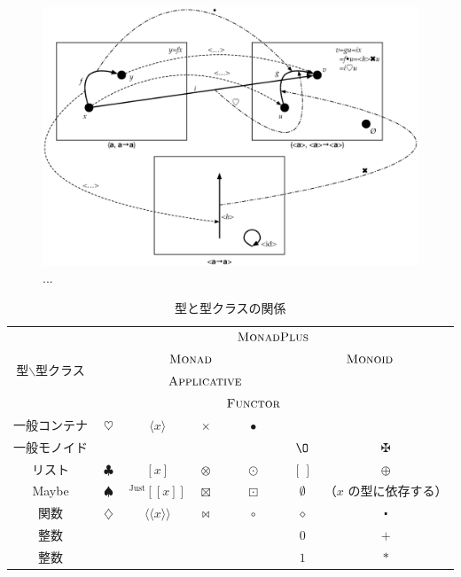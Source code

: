 \documentclass[a5paper,twoside,fleqn]{jsbook}
\def\[{\left[\!\left[}
\def\]{\right]\!\right]}
\newcommand{\Langle}{\langle\!\langle}
\newcommand{\Rangle}{\rangle\!\rangle}
\newcommand{\mEmptyList}{{[\,]}}
\newcommand{\mNothing}{\emptyset}
\newcommand{\mZero}{\O}
\newcommand{\mAnonParam}{\diamond}
\DeclareMathOperator{\mAppend}{\oplus}
\DeclareMathOperator{\mAppMap}{\times}
\DeclareMathOperator{\mAppMapFunc}{\bowtie}
\DeclareMathOperator{\mAppMapList}{\otimes}
\DeclareMathOperator{\mAppMapMaybe}{\boxtimes}
\DeclareMathOperator{\mBind}{\heartsuit}
\DeclareMathOperator{\mBindFunc}{\diamondsuit}
\DeclareMathOperator{\mBindList}{\clubsuit}
\DeclareMathOperator{\mBindMaybe}{\spadesuit}
\DeclareMathOperator{\mComp}{\centerdot}
\DeclareMathOperator{\mMap}{\bullet}
\DeclareMathOperator{\mMapFunc}{\circ}
\DeclareMathOperator{\mMapList}{\odot}
\DeclareMathOperator{\mMapMaybe}{\boxdot}
\DeclareMathOperator{\mPlus}{\maltese}
\newcommand{\mGenericValueConstructor}[1]{\mathrm{#1}}
\newcommand{\mGenericWith}[2]{{}^\mGenericValueConstructor{#1}\[#2\]}
\newcommand{\mJustWith}[1]{\mGenericWith{Just}{#1}}
\newcommand{\mFuncWith}[1]{\Langle#1\Rangle}
\newcommand{\mListWith}[1]{\left[#1\right]}
\newcommand{\mPureWith}[1]{\langle#1\rangle}
\newcommand{\mGenericTypeClass}[1]{\textsc{#1}} %
\newcommand{\mApplicativeTypeClass}{\mGenericTypeClass{Applicative}}
\newcommand{\mFunctorTypeClass}{\mGenericTypeClass{Functor}}
\newcommand{\mMonadTypeClass}{\mGenericTypeClass{Monad}}
\newcommand{\mMonadPlusTypeClass}{\mGenericTypeClass{MonadPlus}}
\newcommand{\mMonoidTypeClass}{\mGenericTypeClass{Monoid}}
\begin{document}
\begin{figure}
\begin{center}
\includegraphics[width=150mm]{fig/functor.eps}
\end{center}
\caption{...}
\label{fig:functor}
\end{figure}





\begin{table}
\label{tab:monadplus}
\caption{型と型クラスの関係}
\begin{center}
\begin{tabular}{||c||c|c|c|c|c|c||}
\hline
\multirow{4}{*}{型$\backslash$型クラス}
  &\multicolumn{6}{|c||}{$\mMonadPlusTypeClass$}\\
\cline{2-7}
\multirow{3}{*}{}
  &\multicolumn{4}{|c|}{$\mMonadTypeClass$}
  &\multicolumn{2}{|c||}{$\mMonoidTypeClass$}\\
\cline{3-5}
\multirow{2}{*}{}
  &
  &\multicolumn{3}{|c|}{$\mApplicativeTypeClass$}
  &\multicolumn{2}{|c||}{}\\
\cline{5-5}
\multirow{1}{*}{}
  &
  &\multicolumn{2}{|c|}{}
  &$\mFunctorTypeClass$
  &\multicolumn{2}{|c||}{}\\
\hline\hline
一般コンテナ
  &$\mBind$
  &$\mPureWith{x}$
  &$\mAppMap$
  &$\mMap$
  &
  &\\
\hline
一般モノイド
  &
  &
  &
  &
  &$\mZero$
  &$\mPlus$\\
\hline
リスト
  &$\mBindList$
  &$\mListWith{x}$
  &$\mAppMapList$
  &$\mMapList$
  &$\mEmptyList$
  &$\mAppend$\\
\hline
Maybe
  &$\mBindMaybe$
  &$\mJustWith{x}$
  &$\mAppMapMaybe$
  &$\mMapMaybe$
  &$\mNothing$
  &（$x$ の型に依存する）\\
\hline
関数
  &$\mBindFunc$
  &$\mFuncWith{x}$
  &$\mAppMapFunc$
  &$\mMapFunc$
  &$\mAnonParam$
  &$\mComp$\\
\hline
整数
  &
  &
  &
  &
  &$0$
  &$+$\\
\hline
整数
  &
  &
  &
  &
  &$1$
  &$*$\\
\hline
\end{tabular}
\end{center}
\end{table}
\end{document}
